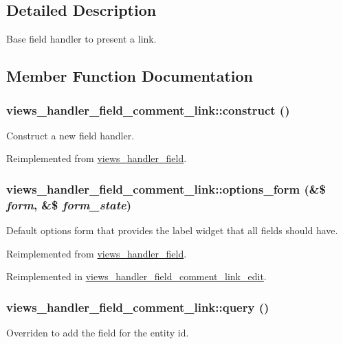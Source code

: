 \subsection{Detailed Description}
Base field handler to present a link. 

\subsection{Member Function Documentation}
\hypertarget{classviews__handler__field__comment__link_a11c7fcae5ff5f91fa48fc1581115869b}{
\subsubsection[{construct}]{\setlength{\rightskip}{0pt plus 5cm}views\_\-handler\_\-field\_\-comment\_\-link::construct ()}}
\label{classviews__handler__field__comment__link_a11c7fcae5ff5f91fa48fc1581115869b}
Construct a new field handler. 

Reimplemented from \hyperlink{classviews__handler__field_a3d50050864c255b71c842972a45d39f6}{views\_\-handler\_\-field}.\hypertarget{classviews__handler__field__comment__link_a82957426a30584198c79c78804265bdc}{
\subsubsection[{options\_\-form}]{\setlength{\rightskip}{0pt plus 5cm}views\_\-handler\_\-field\_\-comment\_\-link::options\_\-form (\&\$ {\em form}, \/  \&\$ {\em form\_\-state})}}
\label{classviews__handler__field__comment__link_a82957426a30584198c79c78804265bdc}
Default options form that provides the label widget that all fields should have. 

Reimplemented from \hyperlink{classviews__handler__field_a0435d161922b7b4b84f02a2e79bb947a}{views\_\-handler\_\-field}.

Reimplemented in \hyperlink{classviews__handler__field__comment__link__edit_acabe2521c15d2c3d8e48cff803bb3def}{views\_\-handler\_\-field\_\-comment\_\-link\_\-edit}.\hypertarget{classviews__handler__field__comment__link_ac19c2cedce77bfa9490624df9cd1eac2}{
\subsubsection[{query}]{\setlength{\rightskip}{0pt plus 5cm}views\_\-handler\_\-field\_\-comment\_\-link::query ()}}
\label{classviews__handler__field__comment__link_ac19c2cedce77bfa9490624df9cd1eac2}
Overriden to add the field for the entity id. 


